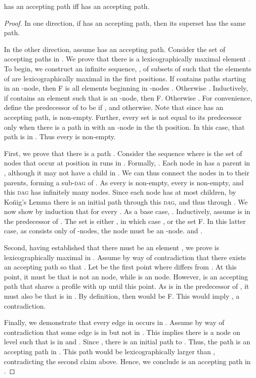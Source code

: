 \documentclass{LMCS}
\newcommand\konig{Ko\"nig\xspace}
\newcommand{\DAG}{\textsc{dag}\xspace}
\begin{document}
\begin{lem}\label{Lexicographic_Edge_Pruning}
 has an accepting path iff  has an accepting path.
\end{lem}
\begin{proof}
In one direction, if  has an accepting path, then its superset  has the same path.

In the other direction, assume  has an accepting path. Consider the set  of accepting paths
in . We prove that there is a lexicographically maximal element .  To begin,
we construct an infinite sequence, , of subsets of  such that the elements of
 are lexicographically maximal in the first  positions.  If  contains paths starting in
an -node, then F is all elements beginning
in -nodes . Otherwise . Inductively, if  contains an element  such that 
is an -node, then F.  Otherwise
. For convenience, define the predecessor of  to be  if , and 
otherwise.  Note that since  has an accepting path,  is non-empty. Further, every set 
is not equal to its predecessor  only when there is a path in  with an -node in the th
position. In this case, that path is in . Thus every  is non-empty. 

First, we prove that there is a path .  Consider the sequence
 where  is the set of nodes that occur at position  in runs in
.  Formally, . Each node in  has a parent in
, although it may not have a child in . We can thus connect the nodes in
 to their parents, forming a sub-\DAG of . As every  is non-empty, every
 is non-empty, and this \DAG has infinitely many nodes. Since each node has at most 
children, by \konig's Lemma there is an initial path  through this \DAG, and thus through .
We now show by induction that  for every . As a base case, . Inductively,
assume  is in the predecessor  of . The set  is either , in which case , or the set F.  In this latter case, as
 consists only of -nodes, the node  must be an -node.  and . 

Second, having established that there must be an element , we prove
 is lexicographically maximal in .  Assume by way of contradiction that there exists an
accepting path  so that . Let  be the first point where 
differs from .  At this point, it must be that  is not an  node, while  is
an  node.  However,  is an accepting path that shares a profile with  up until this
point. As  is in the predecessor  of , it must also be that  is in .  By
definition,  then would be F. This would
imply , a contradiction.

Finally, we demonstrate that every edge in  occurs in . Assume by way of contradiction
that some edge  is in  but not in . This implies there is a node  on
level  such that  is in  and . Since , there is an
initial path  to .  Thus, the path  is an accepting path in
.  This path would be lexicographically larger than , contradicting the second claim above.
Hence, we conclude  is an accepting path in .
\end{proof}
\end{document}
